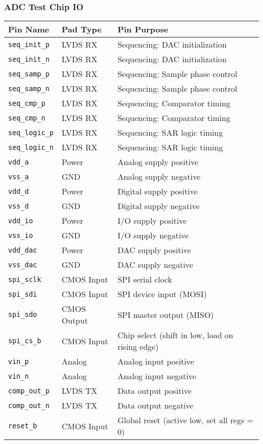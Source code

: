 \documentclass[aspectratio=169]{beamer}
\begin{document}
\begin{frame}
  \frametitle{ADC Test Chip IO}
  \begin{center}
    \tiny
    \begin{tabular}{|l|l|l|}
    \hline
    \textbf{Pin Name} & \textbf{Pad Type} & \textbf{Pin Purpose} \\
    \hline
    \texttt{seq\_init\_p}  & LVDS RX      & Sequencing: DAC initialization \\
    \texttt{seq\_init\_n}  & LVDS RX      & Sequencing: DAC initialization \\
    \texttt{seq\_samp\_p}  & LVDS RX      & Sequencing: Sample phase control \\
    \texttt{seq\_samp\_n}  & LVDS RX      & Sequencing: Sample phase control \\
    \texttt{seq\_cmp\_p}   & LVDS RX      & Sequencing: Comparator timing \\
    \texttt{seq\_cmp\_n}   & LVDS RX      & Sequencing: Comparator timing \\
    \texttt{seq\_logic\_p} & LVDS RX      & Sequencing: SAR logic timing \\
    \texttt{seq\_logic\_n} & LVDS RX      & Sequencing: SAR logic timing \\
    \texttt{vdd\_a}        & Power        & Analog supply positive \\
    \texttt{vss\_a}        & GND          & Analog supply negative \\
    \texttt{vdd\_d}        & Power        & Digital supply positive \\
    \texttt{vss\_d}        & GND          & Digital supply negative \\
    \texttt{vdd\_io}       & Power        & I/O supply positive \\
    \texttt{vss\_io}       & GND          & I/O supply negative \\
    \texttt{vdd\_dac}      & Power        & DAC supply positive \\
    \texttt{vss\_dac}      & GND          & DAC supply negative \\
    \texttt{spi\_sclk}     & CMOS Input   & SPI serial clock \\
    \texttt{spi\_sdi}     & CMOS Input   & SPI device input (MOSI) \\
    \texttt{spi\_sdo}     & CMOS Output  & SPI master output (MISO)  \\
    \texttt{spi\_cs\_b}    & CMOS Input   & Chip select (shift in low, load on rising edge) \\
    \texttt{vin\_p}        & Analog       & Analog input positive \\
    \texttt{vin\_n}        & Analog       & Analog input negative \\
    \texttt{comp\_out\_p}  & LVDS TX      & Data output positive \\
    \texttt{comp\_out\_n}  & LVDS TX      & Data output negative \\
    \texttt{reset\_b}      & CMOS Input   & Global reset (active low, set all regs = 0) \\
    \hline
    \end{tabular}
    

\end{center}
\end{frame}
\end{document}
